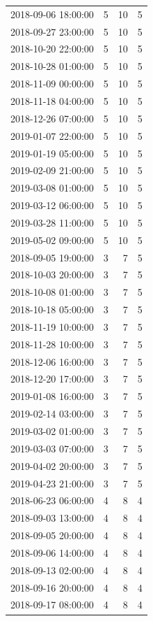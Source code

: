 \begin{tabular}{lrrr}
2018-09-06 18:00:00 & 5 & 10 & 5 \\
2018-09-27 23:00:00 & 5 & 10 & 5 \\
2018-10-20 22:00:00 & 5 & 10 & 5 \\
2018-10-28 01:00:00 & 5 & 10 & 5 \\
2018-11-09 00:00:00 & 5 & 10 & 5 \\
2018-11-18 04:00:00 & 5 & 10 & 5 \\
2018-12-26 07:00:00 & 5 & 10 & 5 \\
2019-01-07 22:00:00 & 5 & 10 & 5 \\
2019-01-19 05:00:00 & 5 & 10 & 5 \\
2019-02-09 21:00:00 & 5 & 10 & 5 \\
2019-03-08 01:00:00 & 5 & 10 & 5 \\
2019-03-12 06:00:00 & 5 & 10 & 5 \\
2019-03-28 11:00:00 & 5 & 10 & 5 \\
2019-05-02 09:00:00 & 5 & 10 & 5 \\
2018-09-05 19:00:00 & 3 & 7 & 5 \\
2018-10-03 20:00:00 & 3 & 7 & 5 \\
2018-10-08 01:00:00 & 3 & 7 & 5 \\
2018-10-18 05:00:00 & 3 & 7 & 5 \\
2018-11-19 10:00:00 & 3 & 7 & 5 \\
2018-11-28 10:00:00 & 3 & 7 & 5 \\
2018-12-06 16:00:00 & 3 & 7 & 5 \\
2018-12-20 17:00:00 & 3 & 7 & 5 \\
2019-01-08 16:00:00 & 3 & 7 & 5 \\
2019-02-14 03:00:00 & 3 & 7 & 5 \\
2019-03-02 01:00:00 & 3 & 7 & 5 \\
2019-03-03 07:00:00 & 3 & 7 & 5 \\
2019-04-02 20:00:00 & 3 & 7 & 5 \\
2019-04-23 21:00:00 & 3 & 7 & 5 \\
2018-06-23 06:00:00 & 4 & 8 & 4 \\
2018-09-03 13:00:00 & 4 & 8 & 4 \\
2018-09-05 20:00:00 & 4 & 8 & 4 \\
2018-09-06 14:00:00 & 4 & 8 & 4 \\
2018-09-13 02:00:00 & 4 & 8 & 4 \\
2018-09-16 20:00:00 & 4 & 8 & 4 \\
2018-09-17 08:00:00 & 4 & 8 & 4 \\

\end{tabular}
